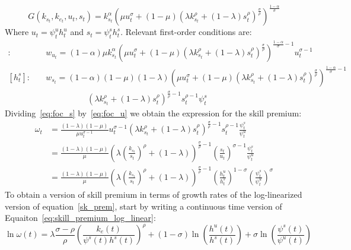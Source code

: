 \documentclass[12pt]{article}
\begin{document}
\begin{equation}\label{eq:prod}
 G(k_{s_t}, k_{e_t}, u_t, s_t) = k_{s_t}^\alpha\left( \mu u_t^\sigma + (1-\mu)\left(\lambda k_{s_t}^\rho + (1-\lambda)s_t^\rho\right)^\frac{\sigma}{\rho}\right)^\frac{1-\alpha}{\sigma}
\end{equation}
Where $u_t = \psi^u_t h^u_t$ and $s_t = \psi^s_t h^s_t$. Relevant first-order conditions are:
\begin{align}
 [h^u_t]:&\quad w_{u_t} = (1-\alpha) \mu k_{s_t}^\alpha\left( \mu u_t^\sigma + (1-\mu)\left(\lambda k_{s_t}^\rho + (1-\lambda)s_t^\rho\right)^\frac{\sigma}{\rho}\right)^{\frac{1-\alpha}{\sigma}-1} u_t^{\sigma-1} \label{eq:foc_u}\\
 [h^s_t]:&\quad w_{s_t} = (1-\alpha) (1-\mu)(1-\lambda) \left( \mu u_t^\sigma + (1-\mu)\left(\lambda k_{s_t}^\rho +(1-\lambda)s_t^\rho\right)^\frac{\sigma}{\rho}\right)^{\frac{1-\alpha}{\sigma}-1} \nonumber\\ & \qquad\qquad\qquad \left(\lambda k_{s_t}^\rho + (1-\lambda)s_t^\rho\right)^{\frac{\sigma}{\rho}-1} s_t^{\rho-1} \psi^s_t\label{eq:foc_s}
\end{align}
Dividing~\eqref{eq:foc_s} by~\eqref{eq:foc_u} we obtain the expression for the skill premium:
\begin{align}%
 \omega_t &= \frac{(1-\lambda)(1-\mu)}{\mu u_t^{\sigma-1}}u_t^{\sigma-1}(\lambda k_{s_t}^\rho + (1-\lambda)s_t^\rho)^{\frac{\sigma}{\rho}-1}s_t^{\rho-1}\frac{\psi^s_t}{\psi^u_t}\nonumber\\
 &= \frac{(1-\lambda)(1-\mu)}{\mu}\left(\lambda \left(\frac{k_{s_t}}{s_t}\right)^\rho + (1-\lambda)\right)^{\frac{\sigma}{\rho}-1}\left(\frac{s_t}{u_t}\right)^{\sigma-1}\frac{\psi^s_t}{\psi^u_t}\nonumber\\
 &= \frac{(1-\lambda)(1-\mu)}{\mu}\left(\lambda \left(\frac{k_{s_t}}{s_t}\right)^\rho + (1-\lambda)\right)^{\frac{\sigma}{\rho}-1}\left(\frac{h^u_t}{h^s_t}\right)^{1 - \sigma}\left(\frac{\psi^s_t}{\psi^u_t}\right)^\sigma \label{sk_prem}
\end{align}
To obtain a version of skill premium in terms of growth rates of the log-linearized version of equation~\eqref{sk_prem}, start by writing a continuous time version of Equaiton~\eqref{eq:skill_premium_log_linear}:
\begin{equation}\label{eq:skill_premium_log_linear_continuous}
 \ln{\omega(t)} = \lambda \frac{\sigma-\rho}{\rho}\left(\frac{k_{e}(t)}{\psi^s(t) h^s(t) }\right)^\rho + (1-\sigma)\ln{\left(\frac{h^u(t)}{h^s(t)}\right)} + \sigma\ln{\left(\frac{\psi^s(t)}{\psi^u(t)}\right)}
\end{equation}
\end{document}
